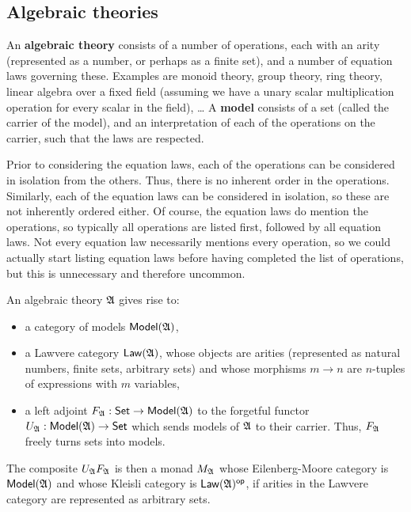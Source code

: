\documentclass[a4paper]{article}
\begin{document}
\subsection{Algebraic theories}
An \textbf{algebraic theory} consists of a number of operations, each with an arity (represented as a number, or perhaps as a finite set), and a number of equation laws governing these.
Examples are monoid theory, group theory, ring theory, linear algebra over a fixed field (assuming we have a unary scalar multiplication operation for every scalar in the field), \ldots{}
A \textbf{model} consists of a set (called the carrier of the model), and an interpretation of each of the operations on the carrier, such that the laws are respected.

Prior to considering the equation laws, each of the operations can be considered in isolation from the others.
Thus, there is no inherent order in the operations.
Similarly, each of the equation laws can be considered in isolation, so these are not inherently ordered either.
Of course, the equation laws do mention the operations, so typically all operations are listed first, followed by all equation laws.
Not every equation law necessarily mentions every operation, so we could actually start listing equation laws before having completed the list of operations, but this is unnecessary and therefore uncommon.

An algebraic theory ${{\mathfrak{A}}}$ gives rise to:
\begin{itemize}
	\item a category of models ${\mathsf{Model}}({{\mathfrak{A}}})$,
	\item a Lawvere category $\mathsf{Law}({{\mathfrak{A}}})$, whose objects are arities (represented as natural numbers, finite sets, arbitrary sets) and whose morphisms $m \to n$ are $n$-tuples of expressions with $m$ variables,
	\item a left adjoint $F_{{\mathfrak{A}}} : {\mathsf{Set}} \to {\mathsf{Model}}({{\mathfrak{A}}})$ to the forgetful functor $U_{{\mathfrak{A}}} : {\mathsf{Model}}({{\mathfrak{A}}}) \to {\mathsf{Set}}$ which sends models of ${{\mathfrak{A}}}$ to their carrier. Thus, $F_{{\mathfrak{A}}}$ freely turns sets into models.
\end{itemize}
The composite $U_{{\mathfrak{A}}} F_{{\mathfrak{A}}}$ is then a monad $M_{{\mathfrak{A}}}$ whose Eilenberg-Moore category is ${\mathsf{Model}}({{\mathfrak{A}}})$ and whose Kleisli category is $\mathsf{Law}({{\mathfrak{A}}})^{\mathsf{op}}$, if arities in the Lawvere category are represented as arbitrary sets.
\end{document}
